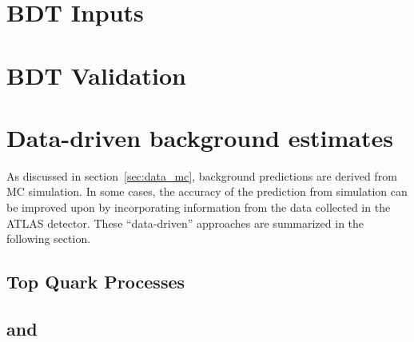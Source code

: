 %

\section{BDT Inputs}

%

\section{BDT Validation}

%

\section{Data-driven background estimates}

As discussed in section~\ref{sec:data_mc}, background predictions are
derived from MC simulation. In some cases, the accuracy of the
prediction from simulation can be improved upon by incorporating
information from the data collected in the ATLAS detector. These
``data-driven'' approaches are summarized in the following section.

\subsection{Top Quark Processes}




%


%

\subsection{\ZDYll and \Ztautau}




